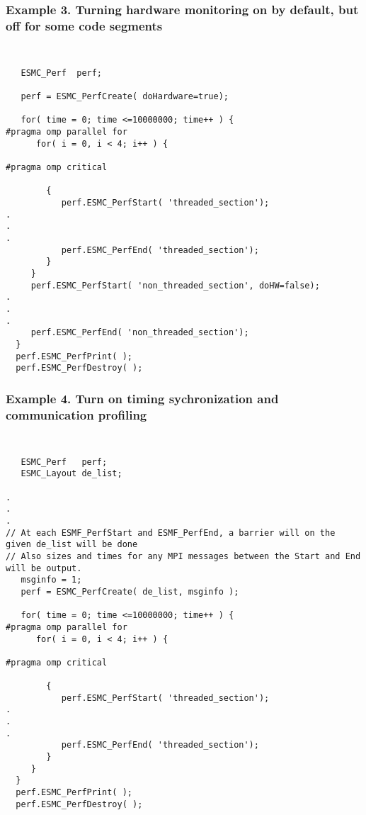 \subsubsection{Example 3. Turning hardware monitoring on by default, but off 
for some code segments}
{\tt
\begin{verbatim}
   ESMC_Perf  perf;

   perf = ESMC_PerfCreate( doHardware=true);

   for( time = 0; time <=10000000; time++ ) {
#pragma omp parallel for
      for( i = 0, i < 4; i++ ) {

#pragma omp critical

        {
           perf.ESMC_PerfStart( 'threaded_section');
.
.
.
           perf.ESMC_PerfEnd( 'threaded_section');
        }
     }
     perf.ESMC_PerfStart( 'non_threaded_section', doHW=false);
.
.
.
     perf.ESMC_PerfEnd( 'non_threaded_section');
  }
  perf.ESMC_PerfPrint( );
  perf.ESMC_PerfDestroy( );
\end{verbatim}
}

\subsubsection{Example 4. Turn on timing sychronization and communication profiling}
{\tt
\begin{verbatim}
   ESMC_Perf   perf;
   ESMC_Layout de_list;

.
.
.
// At each ESMF_PerfStart and ESMF_PerfEnd, a barrier will on the given de_list will be done
// Also sizes and times for any MPI messages between the Start and End will be output.
   msginfo = 1;
   perf = ESMC_PerfCreate( de_list, msginfo );

   for( time = 0; time <=10000000; time++ ) {
#pragma omp parallel for
      for( i = 0, i < 4; i++ ) {

#pragma omp critical

        {
           perf.ESMC_PerfStart( 'threaded_section');
.
.
.
           perf.ESMC_PerfEnd( 'threaded_section');
        }
     }
  }
  perf.ESMC_PerfPrint( );
  perf.ESMC_PerfDestroy( );
\end{verbatim}
}

